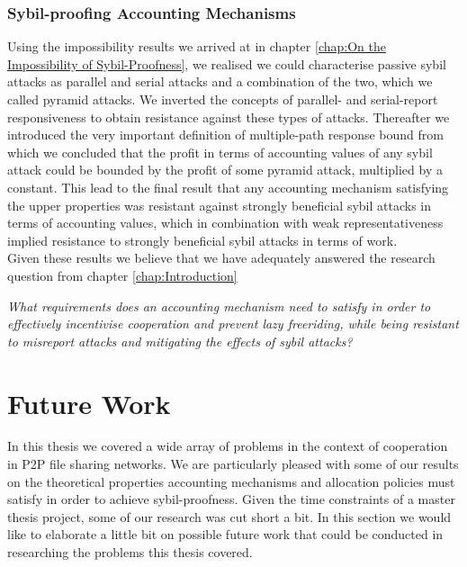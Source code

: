 \subsubsection*{Sybil-proofing Accounting Mechanisms}
\label{subsubsec:Sybil-proofing Accounting Mechanisms}
\noindent{}Using the impossibility results we arrived at in chapter \ref{chap:On the Impossibility of Sybil-Proofness}, we realised we could characterise passive sybil attacks as parallel and serial attacks and a combination of the two, which we called pyramid attacks. We inverted the concepts of parallel- and serial-report responsiveness to obtain resistance against these types of attacks. Thereafter we introduced the very important definition of multiple-path response bound from which we concluded that the profit in terms of accounting values of any sybil attack could be bounded by the profit of some pyramid attack, multiplied by a constant. This lead to the final result that any accounting mechanism satisfying the upper properties was resistant against strongly beneficial sybil attacks in terms of accounting values, which in combination with weak representativeness implied resistance to strongly beneficial sybil attacks in terms of work.\vspace{1em}\\ 

\noindent{}Given these results we believe that we have adequately answered the research question from chapter \ref{chap:Introduction} \vspace{1em}\\

\begin{center}
{\it What requirements does an accounting mechanism need to satisfy in order to effectively incentivise cooperation and prevent lazy freeriding, while being resistant to misreport attacks and mitigating the effects of sybil attacks?} \vspace{1em}\\
\end{center}

\section{Future Work}
\label{sec:Future Work}
\noindent{}In this thesis we covered a wide array of problems in the context of cooperation in P2P file sharing networks. We are particularly pleased with some of our results on the theoretical properties accounting mechanisms and allocation policies must satisfy in order to achieve sybil-proofness. Given the time constraints of a master thesis project, some of our research was cut short a bit. In this section we would like to elaborate a little bit on possible future work that could be conducted in researching the problems this thesis covered. \vspace{1em}\\

